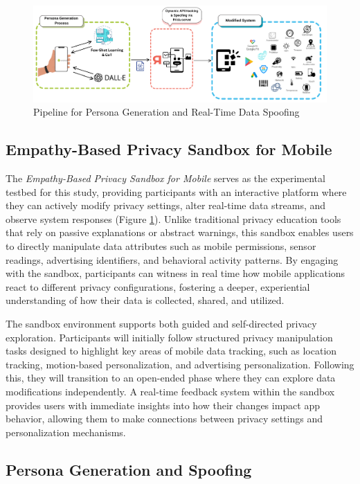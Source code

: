 \documentclass[acmlarge, nonacm]{acmart}
\begin{document}
\begin{figure}[htbp]
    \centering
    \includegraphics[width=\textwidth]{figure-2-methodology.png} 
    \caption{Pipeline for Persona Generation and Real-Time Data Spoofing}
    \label{fig:methodology}
\end{figure}

\subsection{Empathy-Based Privacy Sandbox for Mobile}

The \textit{Empathy-Based Privacy Sandbox for Mobile} serves as the experimental testbed for this study, providing participants with an interactive platform where they can actively modify privacy settings, alter real-time data streams, and observe system responses (Figure \ref{fig:methodology}). Unlike traditional privacy education tools that rely on passive explanations or abstract warnings, this sandbox enables users to directly manipulate data attributes such as mobile permissions, sensor readings, advertising identifiers, and behavioral activity patterns. By engaging with the sandbox, participants can witness in real time how mobile applications react to different privacy configurations, fostering a deeper, experiential understanding of how their data is collected, shared, and utilized.

The sandbox environment supports both guided and self-directed privacy exploration. Participants will initially follow structured privacy manipulation tasks designed to highlight key areas of mobile data tracking, such as location tracking, motion-based personalization, and advertising personalization. Following this, they will transition to an open-ended phase where they can explore data modifications independently. A real-time feedback system within the sandbox provides users with immediate insights into how their changes impact app behavior, allowing them to make connections between privacy settings and personalization mechanisms.
\subsection{Persona Generation and Spoofing}
\end{document}
